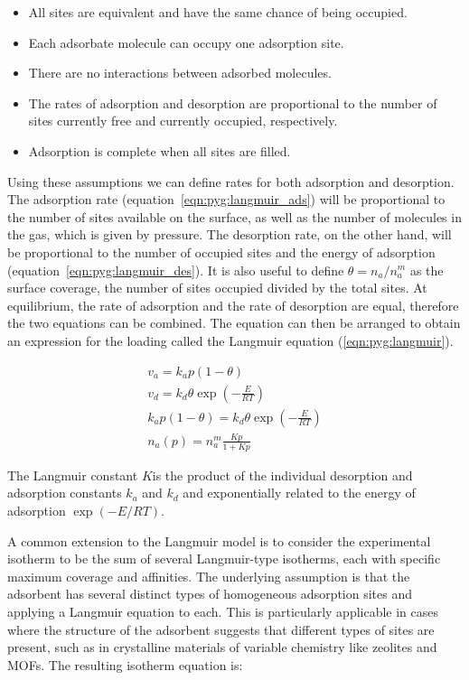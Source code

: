 \begin{itemize}
    
    \item All sites are equivalent and have the same chance of being occupied.
    \item Each adsorbate molecule can occupy one adsorption site.
    \item There are no interactions between adsorbed molecules.
    \item The rates of adsorption and desorption are proportional to the number
    of sites currently free and currently occupied, respectively.
    \item Adsorption is complete when all sites are filled.
    
\end{itemize}

Using these assumptions we can define rates for both adsorption and
desorption. The adsorption rate (equation~\ref{eqn:pyg:langmuir_ads}) 
will be proportional to the number of sites available on the surface, 
as well as the number of molecules in the gas, which is given by pressure.
The desorption rate, on the other hand, will be proportional to the 
number of occupied sites and the energy of adsorption (equation~\ref{eqn:pyg:langmuir_des}).
It is also useful to define \(\theta = n_a/n_a^m\) as the surface coverage,
the number of sites occupied divided by the total sites. At equilibrium, 
the rate of adsorption and the rate of
desorption are equal, therefore the two equations can be combined.
The equation can then be arranged to obtain an expression for the 
loading called the Langmuir equation (\ref{eqn:pyg:langmuir}).

\begin{gather}
    v_a = k_a p (1 - \theta) \label{eqn:pyg:langmuir_ads} \\
    v_d = k_d \theta \exp{(-\frac{E}{RT})} \label{eqn:pyg:langmuir_des} \\
    k_a p (1 - \theta) = k_d \theta \exp{(-\frac{E}{RT})} \\
    n_a(p) = n_a^m \frac{Kp}{1+Kp} \label{eqn:pyg:langmuir}
\end{gather}

The Langmuir constant \(K\)is the product of the individual desorption 
and adsorption constants \(k_a\) and \(k_d\) and exponentially 
related to the energy of adsorption \(\exp{(-{E}/{RT})}\).

A common extension to the Langmuir model is to consider 
the experimental isotherm to be the sum of several Langmuir-type
isotherms, each with specific maximum coverage and affinities.
The underlying assumption is that the adsorbent has several distinct
types of homogeneous adsorption sites and applying a Langmuir
equation to each. This is particularly
applicable in cases where the structure of the adsorbent 
suggests that different types of sites are present, 
such as in crystalline materials of variable chemistry like 
zeolites and MOFs. The resulting isotherm equation is:

